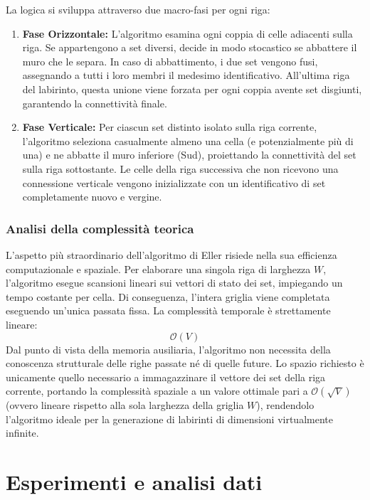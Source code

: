 \documentclass[12pt, a4paper]{article}
\begin{document}
	La logica si sviluppa attraverso due macro-fasi per ogni riga:
	\begin{enumerate}
		\item \textbf{Fase Orizzontale:} L'algoritmo esamina ogni coppia di celle adiacenti sulla riga. Se appartengono a set diversi, decide in modo stocastico se abbattere il muro che le separa. In caso di abbattimento, i due set vengono fusi, assegnando a tutti i loro membri il medesimo identificativo. All'ultima riga del labirinto, questa unione viene forzata per ogni coppia avente set disgiunti, garantendo la connettività finale.
		\item \textbf{Fase Verticale:} Per ciascun set distinto isolato sulla riga corrente, l'algoritmo seleziona casualmente almeno una cella (e potenzialmente più di una) e ne abbatte il muro inferiore (Sud), proiettando la connettività del set sulla riga sottostante. Le celle della riga successiva che non ricevono una connessione verticale vengono inizializzate con un identificativo di set completamente nuovo e vergine.
	\end{enumerate}
	
	\subsubsection{Analisi della complessità teorica}
	L'aspetto più straordinario dell'algoritmo di Eller risiede nella sua efficienza computazionale e spaziale. Per elaborare una singola riga di larghezza $W$, l'algoritmo esegue scansioni lineari sui vettori di stato dei set, impiegando un tempo costante per cella. Di conseguenza, l'intera griglia viene completata eseguendo un'unica passata fissa. La complessità temporale è strettamente lineare:
	$$\mathcal{O}(V)$$
	Dal punto di vista della memoria ausiliaria, l'algoritmo non necessita della conoscenza strutturale delle righe passate né di quelle future. Lo spazio richiesto è unicamente quello necessario a immagazzinare il vettore dei set della riga corrente, portando la complessità spaziale a un valore ottimale pari a $\mathcal{O}(\sqrt{V})$ (ovvero lineare rispetto alla sola larghezza della griglia $W$), rendendolo l'algoritmo ideale per la generazione di labirinti di dimensioni virtualmente infinite.
	
	\section{Esperimenti e analisi dati}
	
\end{document}
